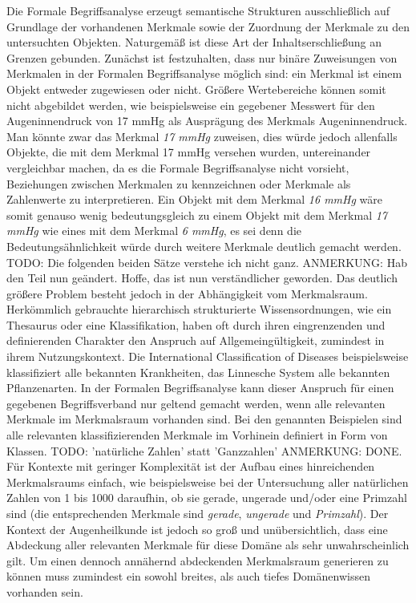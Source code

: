 \documentclass[pagesize,DIV=calc,12pt,draft]{scrreprt}
\begin{document}
Die Formale Begriffsanalyse erzeugt semantische Strukturen ausschließlich auf Grundlage der vorhandenen Merkmale sowie der Zuordnung der Merkmale zu den untersuchten Objekten. 
Naturgemäß ist diese Art der Inhaltserschließung an Grenzen gebunden. 
Zunächst ist festzuhalten, dass nur binäre Zuweisungen von Merkmalen in der Formalen Begriffsanalyse möglich sind: ein Merkmal ist einem Objekt entweder zugewiesen oder nicht. 
Größere Wertebereiche können somit nicht abgebildet werden, wie beispielsweise ein gegebener Messwert für den Augeninnendruck von 17 mmHg als Ausprägung des Merkmals Augeninnendruck. 
Man könnte zwar das Merkmal \emph{17 mmHg} zuweisen, dies würde jedoch allenfalls Objekte, die mit dem Merkmal 17 mmHg versehen wurden, untereinander vergleichbar machen, da es die Formale Begriffsanalyse nicht vorsieht, Beziehungen zwischen Merkmalen zu kennzeichnen oder Merkmale als Zahlenwerte zu interpretieren. 
Ein Objekt mit dem Merkmal \emph{16 mmHg} wäre somit genauso wenig bedeutungsgleich zu einem Objekt mit dem Merkmal \emph{17 mmHg} wie eines mit dem Merkmal \emph{6 mmHg}, es sei denn die Bedeutungsähnlichkeit würde durch weitere Merkmale deutlich gemacht werden. 
TODO: Die folgenden beiden Sätze verstehe ich nicht ganz.
ANMERKUNG: Hab den Teil nun geändert. Hoffe, das ist nun verständlicher geworden.
Das deutlich größere Problem besteht jedoch in der Abhängigkeit vom Merkmalsraum. 
Herkömmlich gebrauchte hierarchisch strukturierte Wissensordnungen, wie ein Thesaurus oder eine Klassifikation, haben oft durch ihren eingrenzenden und definierenden Charakter den Anspruch auf Allgemeingültigkeit, zumindest in ihrem Nutzungskontext. 
Die International Classification of Diseases beispielsweise klassifiziert alle bekannten Krankheiten, das Linnesche System alle bekannten Pflanzenarten. 
In der Formalen Begriffsanalyse kann dieser Anspruch für einen gegebenen Begriffsverband nur geltend gemacht werden, wenn alle relevanten Merkmale im Merkmalsraum vorhanden sind. 
Bei den genannten Beispielen sind alle relevanten klassifizierenden Merkmale im Vorhinein definiert in Form von Klassen. 
TODO: 'natürliche Zahlen' statt 'Ganzzahlen'
ANMERKUNG: DONE.
Für Kontexte mit geringer Komplexität ist der Aufbau eines hinreichenden Merkmalsraums einfach, wie beispielsweise bei der Untersuchung aller natürlichen Zahlen von 1 bis 1000 daraufhin, ob sie gerade, ungerade und/oder eine Primzahl sind (die entsprechenden Merkmale sind \emph{gerade}, \emph{ungerade} und \emph{Primzahl}).
Der Kontext der Augenheilkunde ist jedoch so groß und unübersichtlich, dass eine Abdeckung aller relevanten Merkmale für diese Domäne als sehr unwahrscheinlich gilt. 
Um einen dennoch annähernd abdeckenden Merkmalsraum generieren zu können muss zumindest ein sowohl breites, als auch tiefes Domänenwissen vorhanden sein. 
\end{document}
